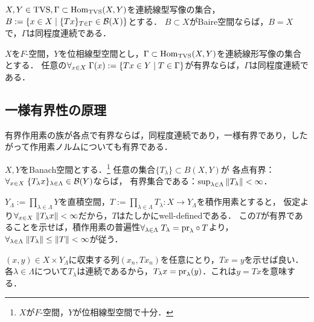 \documentclass[uplatex,dvipdfmx]{jsreport}
\begin{document}
\begin{theorem}
    $X,Y\in\mathrm{TVS},\Gamma\subset\mathrm{Hom}_{\mathrm{TVS}}(X,Y)$を連続線型写像の集合，$B:=\left\{x\in X\mid \{Tx\}_{T\in\Gamma}\in\mathcal{B}(X)\right\}$とする．
    $B\subset X$がBaire空間ならば，$B=X$で，$\Gamma$は同程度連続である．
\end{theorem}

\begin{corollary}[各点有界ならば同程度連続]
    $X$を$F$-空間，$Y$を位相線型空間とし，$\Gamma\subset\mathrm{Hom}_{\mathrm{TVS}}(X,Y)$を連続線形写像の集合とする．
    任意の$\forall_{x\in X}\;\Gamma(x):=\left\{Tx\in Y\mid T\in\Gamma\right\}$が有界ならば，$\Gamma$は同程度連続である．
\end{corollary}

\subsection{一様有界性の原理}

\begin{tcolorbox}[colframe=ForestGreen, colback=ForestGreen!10!white,breakable,colbacktitle=ForestGreen!40!white,coltitle=black,fonttitle=\bfseries\sffamily,
title=]
    有界作用素の族が各点で有界ならば，同程度連続であり，一様有界であり，したがって作用素ノルムについても有界である．
\end{tcolorbox}

\begin{theorem}[作用素族は各点有界ならば(一様)有界]
    $X,Y$をBanach空間とする．\footnote{$X$が$F$-空間，$Y$が位相線型空間で十分．}
    任意の集合$\{T_\lambda\}\subset B(X,Y)$が
    各点有界：$\forall_{x\in X}\;\{T_\lambda x\}_{\lambda\in\Lambda}\in\mathcal{B}(Y)$ならば，
    有界集合である：$\sup_{\lambda\in\Lambda}\|T_\lambda\|<\infty$．
\end{theorem}
\begin{Proof}
    $Y_\Lambda:=\prod_{\lambda\in\Lambda}Y$を直積空間，$T:=\prod_{\lambda\in\Lambda}T_\lambda:X\to Y_\Lambda$を積作用素とすると，
    仮定より$\forall_{x\in X}\;\|T_\lambda x\|<\infty$だから，$T$はたしかにwell-definedである．
    この$T$が有界であることを示せば，積作用素の普遍性$\forall_{\lambda\in\Lambda}\;T_\lambda=\mathrm{pr}_\lambda\circ T$より，$\forall_{\lambda\in\Lambda}\;\|T_\lambda\|\le\|T\|<\infty$が従う．

    $(x,y)\in X\times Y_\Lambda$に収束する列$(x_n,Tx_n)$を任意にとり，$Tx=y$を示せば良い．
    各$\lambda\in\Lambda$について$T_\lambda$は連続であるから，$T_\lambda x=\mathrm{pr}_\lambda(y)$．これは$y=Tx$を意味する．
\end{Proof}
\end{document}
